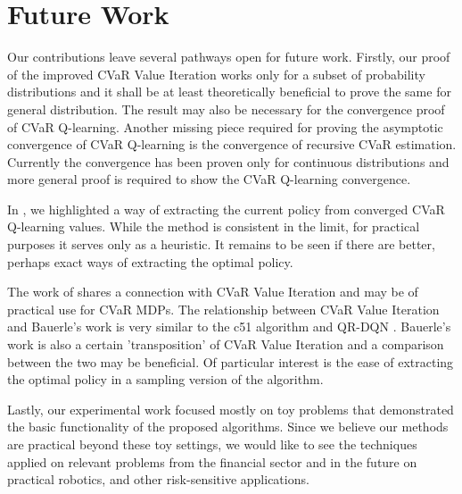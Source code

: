
\section{Future Work}

Our contributions leave several pathways open for future work. Firstly, our proof of the improved CVaR Value Iteration works only for a subset of probability distributions and it shall be at least theoretically beneficial to prove the same for general distribution. The result may also be necessary for the convergence proof of CVaR Q-learning. Another missing piece required for proving the asymptotic convergence of CVaR Q-learning is the convergence of recursive CVaR estimation. Currently the convergence has been proven only for continuous distributions and more general proof is required to show the CVaR Q-learning convergence.

In , we highlighted a way of extracting the current policy from converged CVaR Q-learning values. While the method is consistent in the limit, for practical purposes it serves only as a heuristic. It remains to be seen if there are better, perhaps exact ways of extracting the optimal policy.

The work of \citet{bauerle2011markov} shares a connection with CVaR Value Iteration and may be of practical use for CVaR MDPs. The relationship between CVaR Value Iteration and Bauerle's work is very similar to the c51 algorithm \citep{bellemare2017distributional} and QR-DQN \citep{dabney2017distributional}. Bauerle's work is also a certain 'transposition' of CVaR Value Iteration and a comparison between the two may be beneficial. Of particular interest is the ease of extracting the optimal policy in a sampling version of the algorithm.

Lastly, our experimental work focused mostly on toy problems that demonstrated the basic functionality of the proposed algorithms. Since we believe our methods are practical beyond these toy settings, we would like to see the techniques applied on relevant problems from the financial sector and in the future on practical robotics, and other risk-sensitive applications.


